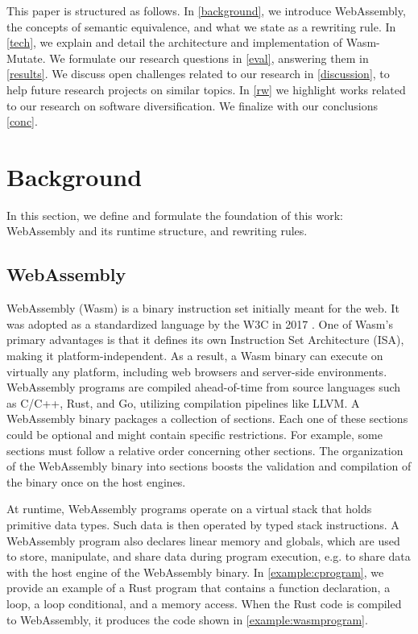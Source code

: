 \documentclass[a4paper,fleqn]{cas-dc}
\newcommand{\tool}{{\sc Wasm-Mutate}\xspace}
\newcommand{\Wasm}{WebAssembly\xspace}
\begin{document}
This paper is structured as follows. 
In \autoref{background}, we introduce WebAssembly, the concepts of semantic equivalence, and what we state as a rewriting rule.
In \autoref{tech}, we explain and detail the architecture and implementation of \tool.
We formulate our research questions in \autoref{eval}, answering them in \autoref{results}.
We discuss open challenges related to our research in \autoref{discussion}, to help future research projects on similar topics.
In \autoref{rw} we highlight works related to our research on software diversification.
We finalize with our conclusions \autoref{conc}.

\section{Background}
\label{background}

In this section, we define and formulate the foundation of this work: WebAssembly and its runtime structure, and rewriting rules.

\subsection{WebAssembly}

WebAssembly (Wasm) is a binary instruction set initially meant for the web. 
It was adopted as a standardized language by the W3C in 2017 \cite{haas2017bringing}. One of Wasm's primary advantages is that it defines its own Instruction Set Architecture (ISA), making it platform-independent. 
As a result, a Wasm binary can execute on virtually any platform, including web browsers and server-side environments. 
WebAssembly programs are compiled ahead-of-time from source languages such as C/C++, Rust, and Go, utilizing compilation pipelines like LLVM. 
A \Wasm binary packages a collection of sections.
Each one of these sections could be optional and might contain specific restrictions.
For example, some sections must follow a relative order concerning other sections.
The organization of the \Wasm binary into sections boosts the validation and compilation of the binary once on the host engines.


At runtime, WebAssembly programs operate on a virtual stack that holds primitive data types.
Such data is then operated by typed stack instructions.
A WebAssembly program also declares linear memory and globals, which are used to store, manipulate, and share data during program execution, e.g. to share data with the host engine of the WebAssembly binary.
In \autoref{example:cprogram}, we provide an example of a Rust program that contains a function declaration, a loop, a loop conditional, and a memory access. When the Rust code is compiled to WebAssembly, it produces the code shown in \autoref{example:wasmprogram}. 
\end{document}
